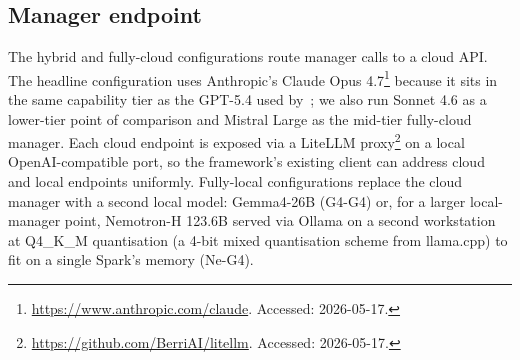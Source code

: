 \documentclass[journal]{IEEEtran}
\begin{document}
\subsection{Manager endpoint}

The hybrid and fully-cloud configurations route manager calls to a cloud API. The headline configuration uses Anthropic's Claude Opus 4.7\footnote{\url{https://www.anthropic.com/claude}. Accessed: 2026-05-17.} because it sits in the same capability tier as the GPT-5.4 used by~\cite{aitaoudia2026aite}; we also run Sonnet 4.6 as a lower-tier point of comparison and Mistral Large as the mid-tier fully-cloud manager. Each cloud endpoint is exposed via a LiteLLM proxy\footnote{\url{https://github.com/BerriAI/litellm}. Accessed: 2026-05-17.} on a local OpenAI-compatible port, so the framework's existing client can address cloud and local endpoints uniformly. Fully-local configurations replace the cloud manager with a second local model: Gemma4-26B (G4-G4) or, for a larger local-manager point, Nemotron-H 123.6B served via Ollama on a second workstation at Q4\_K\_M quantisation (a 4-bit mixed quantisation scheme from llama.cpp) to fit on a single Spark's memory (Ne-G4).
\end{document}
